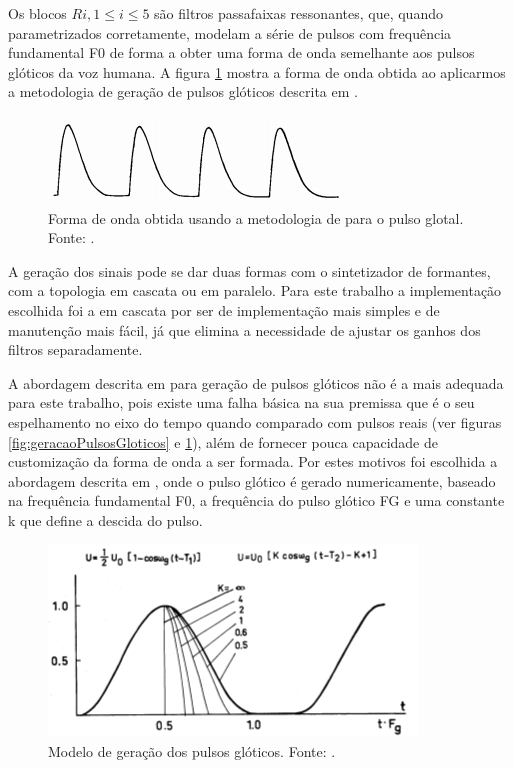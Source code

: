 \documentclass[
  12pt,       
  openright,      
  twoside,      
  a4paper,      
  english,      
  french,       
  spanish,      
  brazil,     
  ]{abntex2}
\begin{document}
Os blocos $ Ri, 1 \leq i \leq 5 $ são filtros passafaixas ressonantes, que, quando parametrizados corretamente, modelam a série de pulsos com frequência fundamental F0 de forma a obter uma forma de onda semelhante aos pulsos glóticos da voz humana. A figura \ref{fig:glotalPulse} mostra a forma de onda obtida ao aplicarmos a metodologia de geração de pulsos glóticos descrita em .

\begin{figure}
\includegraphics{pulso_glotal}
\centering
\caption{Forma de onda obtida usando a metodologia de  para o pulso glotal. Fonte: .}
\label{fig:glotalPulse}
\centering
\end{figure}

A geração dos sinais pode se dar duas formas com o sintetizador de formantes, com a topologia em cascata ou em paralelo. Para este trabalho a implementação escolhida foi a em cascata por ser de implementação mais simples e de manutenção mais fácil, já que elimina a necessidade de ajustar os ganhos dos filtros separadamente.

A abordagem descrita em  para geração de pulsos glóticos não é a mais adequada para este trabalho, pois existe uma falha básica na sua premissa que é o seu espelhamento no eixo do tempo quando comparado com pulsos reais (ver figuras \ref{fig:geracaoPulsosGloticos} e \ref{fig:glotalPulse}), além de fornecer pouca capacidade de customização da forma de onda a ser formada. Por estes motivos foi escolhida a abordagem descrita em , onde o pulso glótico é gerado numericamente, baseado na frequência fundamental F0, a frequência do pulso glótico FG e uma constante k que define a descida do pulso.

\begin{figure}
\centering
\includegraphics{imagens/pulso_glotico_fant_1979}
\caption{Modelo de geração dos pulsos glóticos. Fonte: .}
\label{fig:geracaoPulsosFant}
\centering
\end{figure}
\end{document}
